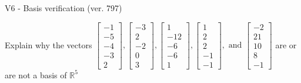 \begin{exercise}
  \begin{exerciseTitle}V6 - Basis verification (ver. 797)\end{exerciseTitle}
  \begin{exerciseStatement}
    Explain why the vectors \(\left[\begin{array}{r}
-1 \\
-5 \\
-4 \\
-3 \\
2
\end{array}\right] , \left[\begin{array}{r}
-3 \\
2 \\
-2 \\
0 \\
3
\end{array}\right] , \left[\begin{array}{r}
1 \\
-12 \\
-6 \\
-6 \\
1
\end{array}\right] , \left[\begin{array}{r}
1 \\
2 \\
2 \\
-1 \\
-1
\end{array}\right] , \text{ and } \left[\begin{array}{r}
-2 \\
21 \\
10 \\
8 \\
-1
\end{array}\right]\) are or are not a basis of \(\mathbb{R}^5\)	



\end{exerciseStatement}
\end{exercise}
